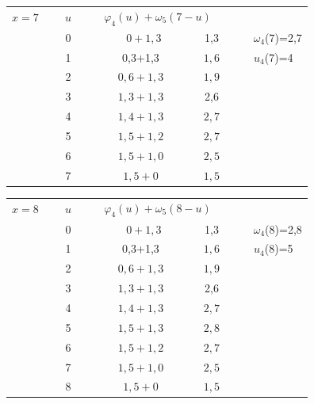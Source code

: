 \begin{flushleft}
\begin{tabular}[c]{c|c|c|c|c  }
\cline{2-4}
$x=7\mspace{10mu}$&$\mspace{15mu}u\mspace{15mu}$&\multicolumn{2}{|c|}{$\mspace{20mu}\varphi_4(u)+\omega_5(7-u)\mspace{18mu}$}& \\[0.07cm]
\cline{2-4}
 &0&$\mspace{40mu}0+1,3\mspace{30mu}$&1,3&$\mspace{32mu}\omega_4$(7)=2,7\\[0.07cm]
\cline{2-4}
 &1&0,3+1,3&$1,6$&$\mspace{18mu}u_4$(7)=4\\[0.07cm]
\cline{2-4}
 &2&$0,6+1,3$&$1,9$\\[0.07cm]
\cline{2-4}
 &3&$1,3+1,3$&2,6\\[0.07cm]
\cline{2-4}
 &4&$1,4+1,3$&$\boxed{2,7}$\\[0.07cm]
\cline{2-4}
 &5&$1,5+1,2$&$2,7$\\[0.07cm]
\cline{2-4}
 &6&$1,5+1,0$&$2,5$\\[0.07cm]
\cline{2-4}
 &7&$1,5+0$&$1,5$\\[0.07cm]
\cline{2-4}
\end{tabular}
\end{flushleft}

\begin{flushleft}
\begin{tabular}[c]{c|c|c|c|c  }
\cline{2-4}
$x=8\mspace{10mu}$&$\mspace{15mu}u\mspace{15mu}$&\multicolumn{2}{|c|}{$\mspace{20mu}\varphi_4(u)+\omega_5(8-u)\mspace{18mu}$}& \\[0.07cm]
\cline{2-4}
 &0&$\mspace{40mu}0+1,3\mspace{30mu}$&1,3&$\mspace{32mu}\omega_4$(8)=2,8\\[0.07cm]
\cline{2-4}
 &1&0,3+1,3&$1,6$&$\mspace{18mu}u_4$(8)=5\\[0.07cm]
\cline{2-4}
 &2&$0,6+1,3$&$1,9$\\[0.07cm]
\cline{2-4}
 &3&$1,3+1,3$&2,6\\[0.07cm]
\cline{2-4}
 &4&$1,4+1,3$&$2,7$\\[0.07cm]
\cline{2-4}
 &5&$1,5+1,3$&$\boxed{2,8}$\\[0.07cm]
\cline{2-4}
 &6&$1,5+1,2$&$2,7$\\[0.07cm]
\cline{2-4}
 &7&$1,5+1,0$&$2,5$\\[0.07cm]
\cline{2-4}
 &8&$1,5+0$&$1,5$\\[0.07cm]
\cline{2-4}
\end{tabular}
\end{flushleft}

